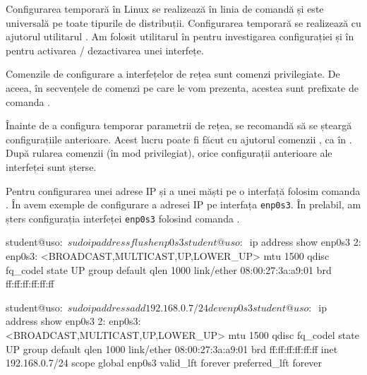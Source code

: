 Configurarea temporară în Linux se realizează în linia de comandă și este universală pe toate tipurile de distribuții.
Configurarea temporară se realizează cu ajutorul utilitarul .
Am folosit utilitarul  în  pentru investigarea configurației și în  pentru activarea / dezactivarea unei interfețe.

Comenzile de configurare a interfețelor de rețea sunt comenzi privilegiate.
De aceea, în secvențele de comenzi pe care le vom prezenta, acestea sunt prefixate de comanda .

Înainte de a configura temporar parametrii de rețea, se recomandă să se șteargă configurațiile anterioare.
Acest lucru poate fi făcut cu ajutorul comenzii , ca în .
După rularea comenzii  (în mod privilegiat), orice configurații anterioare ale interfeței sunt șterse.


Pentru configurarea unei adrese IP și a unei măști pe o interfață folosim comanda .
În  avem exemple de configurare a adresei IP  pe interfața \texttt{enp0s3}.
În prelabil, am șters configurația interfeței \texttt{enp0s3} folosind comanda .

\begin{screen}[caption={Configurarea unei adrese pe o interfață},label={lst:net:add-ip}]
student@uso:~$ sudo ip address flush enp0s3

student@uso:~$ ip address show enp0s3
2: enp0s3: <BROADCAST,MULTICAST,UP,LOWER_UP> mtu 1500 qdisc fq_codel state UP group default qlen 1000
    link/ether 08:00:27:3a:a9:01 brd ff:ff:ff:ff:ff:ff

student@uso:~$ sudo ip address add 192.168.0.7/24 dev enp0s3
student@uso:~$ ip address show enp0s3
2: enp0s3: <BROADCAST,MULTICAST,UP,LOWER_UP> mtu 1500 qdisc fq_codel state UP group default qlen 1000
    link/ether 08:00:27:3a:a9:01 brd ff:ff:ff:ff:ff:ff
    inet 192.168.0.7/24 scope global enp0s3
       valid_lft forever preferred_lft forever
\end{screen}

